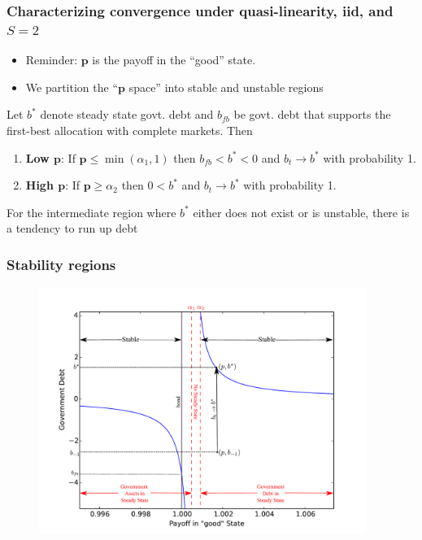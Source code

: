 \documentclass{beamer}
\begin{document}
  \begin{frame}
  \frametitle{Characterizing convergence under quasi-linearity, iid, and $S=2$}

  \begin{itemize}
  \item Reminder:  $\bm{p}$ is the payoff in the ``good'' state.
   \item We partition  the ``$\bm{p}$ space'' into stable and unstable regions
     \end{itemize}

 	\begin{theorem}
Let $b^*$ denote steady state govt.  debt and $b_{fb}$ be  govt.  debt that  supports the first-best allocation with complete markets.  Then %
		\begin{enumerate}
			\item  \textbf{Low $\bm{p}$}: If $\bm{p}\leq\min(\alpha_1,1)$ then  $b_{fb}<b^*<0$ and $b_t\rightarrow b^*$ with probability 1.
			\item \textbf{High  $\bm{p}$}:  If $\bm{p} \geq \alpha_2$ then   $0<b^*$ and $b_t \rightarrow b^*$ with probability 1.
			
			
			\end{enumerate}
			\end{theorem}
			
			For the intermediate region where  $b^*$ either does not exist or is unstable, there is a tendency to run up debt
		
		
	
 \end{frame}


\begin{frame}
   \frametitle{Stability regions}
	\begin{figure}
		\begin{center}
		\includegraphics[width = 4.2in]{Images/graph_stable.pdf}
	\end{center}	
	\end{figure}

  \end{frame}
\end{document}
